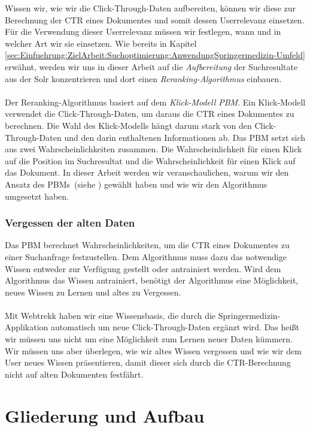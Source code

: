 Wissen wir, wie wir die Click-Through-Daten aufbereiten, können wir diese zur Berechnung der CTR eines Dokumentes und somit dessen Userrelevanz einsetzen. Für die Verwendung dieser Userrelevanz müssen wir festlegen, wann und in welcher Art wir sie einsetzen. Wie bereits in Kapitel \ref{sec:Einfuehrung:ZielArbeit:Suchoptimierung:AnwendungSpringermedizin-Umfeld} erwähnt, werden wir uns in dieser Arbeit auf die \textit{Aufbereitung} der Suchresultate aus der Solr konzentrieren und dort einen \textit{Reranking-Algorithmus} einbauen. 
\\
\\
Der Reranking-Algorithmus basiert auf dem \textit{Klick-Modell PBM}. Ein Klick-Modell verwendet die Click-Through-Daten, um daraus die CTR eines Dokumentes zu berechnen. Die Wahl des Klick-Modells hängt darum stark von den Click-Through-Daten und den darin enthaltenen Informationen ab. Das PBM setzt sich aus zwei Wahrscheinlichkeiten zusammen. Die Wahrscheinlichkeit für einen Klick auf die Position im Suchresultat und die Wahrscheinlichkeit für einen Klick auf das Dokument. In dieser Arbeit werden wir veranschaulichen, warum wir den Ansatz des PBMs~(siehe \cite{pbm}) gewählt haben und wie wir den Algorithmus umgesetzt haben.

\subsubsection{Vergessen der alten Daten}
\label{sec:Einfuehrung:Vergessen}

Das PBM berechnet Wahrscheinlichkeiten, um die CTR eines Dokumentes zu einer Suchanfrage festzustellen. Dem Algorithmus muss dazu das notwendige Wissen entweder zur Verfügung gestellt oder antrainiert werden. Wird dem Algorithmus das Wissen antrainiert, benötigt der Algorithmus eine Möglichkeit, neues Wissen zu Lernen und altes zu Vergessen. 
\\
\\
Mit Webtrekk haben wir eine Wissensbasis, die durch die Springermedizin-Applikation automatisch um neue Click-Through-Daten ergänzt wird. Das heißt wir müssen uns nicht um eine Möglichkeit zum Lernen neuer Daten kümmern. Wir müssen uns aber überlegen, wie wir altes Wissen vergessen und wie wir dem User neues Wissen präsentieren, damit dieser sich durch die CTR-Berechnung nicht auf alten Dokumenten festfährt.


\section{Gliederung und Aufbau}
\label{sec:Einfuehrung:GliederungAufbau}

